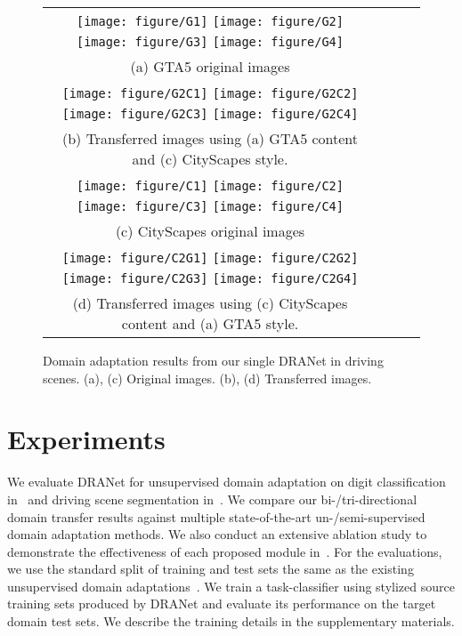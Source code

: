 \documentclass[final]{cvpr}
\begin{document}
\begin{figure*}[t] 
	\centering
	\begin{tabular}{c@{\hspace{1mm}}c@{\hspace{1mm}}c@{\hspace{1mm}}c@{\hspace{1mm}}}
    \texttt{[image: figure/G1]}
    \texttt{[image: figure/G2]}
    \texttt{[image: figure/G3]}
    \texttt{[image: figure/G4]} \\
    \small{(a) GTA5 original images}\\
    \texttt{[image: figure/G2C1]}
    \texttt{[image: figure/G2C2]}
    \texttt{[image: figure/G2C3]}
    \texttt{[image: figure/G2C4]} \\
    \small{(b) Transferred images using (a) GTA5 content and (c) CityScapes style.}\\
    \texttt{[image: figure/C1]}
    \texttt{[image: figure/C2]}
    \texttt{[image: figure/C3]}
    \texttt{[image: figure/C4]}\\
    \small{(c) CityScapes original images}\\
    \texttt{[image: figure/C2G1]}
    \texttt{[image: figure/C2G2]}
    \texttt{[image: figure/C2G3]}
    \texttt{[image: figure/C2G4]}\\
    \small{(d) Transferred images using (c) CityScapes content and (a) GTA5 style.}\\
    \end{tabular}
	\caption{Domain adaptation results from our single DRANet in driving scenes. (a), (c) Original images. (b), (d) Transferred images.}
	\vspace{-2mm}
	\label{fig:segadaptation}
\end{figure*}

\section{Experiments}
\label{sec:experiments}
We evaluate DRANet for unsupervised domain adaptation on digit classification in~ and driving scene segmentation in~.
We compare our bi-/tri-directional domain transfer results against multiple state-of-the-art un-/semi-supervised domain adaptation methods.
We also conduct an extensive ablation study to demonstrate the effectiveness of each proposed module in~.
For the evaluations, we use the standard split of training and test sets the same as the existing unsupervised domain adaptations~\cite{bousmalis2017unsupervised, ye2020light}.
We train a task-classifier using stylized source training sets produced by DRANet and evaluate its performance on the target domain test sets.
We describe the training details in the supplementary materials.
\end{document}
